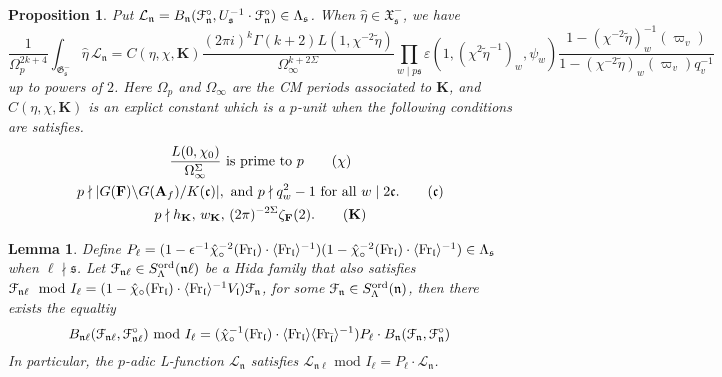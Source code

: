 \documentclass[leqno]{amsart}
\newtheorem{lem}[thm]{Lemma}
\newtheorem{prop}[thm]{Proposition}
\theoremstyle{definition}
\theoremstyle{remark}
\newcommand{\A}{\mathbf A}
\newcommand{\Fr}{\textnormal{Fr}} %
\newcommand{\fc}{\mathfrak{c}}
\newcommand{\fs}{\mathfrak{s}}
\newcommand{\fn}{\mathfrak{n}}
\newcommand{\fl}{\mathfrak{l}}
\newcommand{\F}{{\mathbf{F}}} %
\newcommand{\K}{{\mathbf{K}}} %
\newcommand{\fG}{\mathfrak{G}}
\newcommand{\fX}{\mathfrak{X}}
\newcommand{\euF}{\EuScript{F}} %
\newcommand{\ord}{\textnormal{ord}} %
\begin{document}
\begin{prop}\cite[Thm 7.7]{lee}   
Put $\mathcal{L}_\fn=B_\fn
(\euF^\circ_{\fn},U_\fs^{-1}\cdot\euF^\circ_{\fn})
\in \Lambda_{\fs}$. 
When $ \hat{\eta}\in \fX_{\fs}^-$, we have
\begin{equation*}
	\frac{1}{\Omega_p^{2k+4}}
	\int_{\fG_{\fs}^-}\hat{\eta}\,\mathcal{L}_\fn=
	C(\eta,\chi,\K)
	\frac{(2\pi i)^{k}\Gamma(k+2)
	L(1,\chi^{-2}\tilde{\eta})}{\Omega_\infty^{k+2\Sigma}}
	\prod_{w\mid p\fs}
	\varepsilon(1,(\chi^{2}\tilde{\eta}^{-1})_w,\psi_w)
	\frac{1-(\chi^{-2}\tilde{\eta})^{-1}_w(\varpi_v)}
	{1-(\chi^{-2}\tilde{\eta})_w(\varpi_v)q_v^{-1}}
\end{equation*}
up to powers of $2$.
Here $\Omega_p$ and  $\Omega_\infty$
are the CM periods associated to  $\K$,
and $C(\eta,\chi,\K)$ is an explict constant 
which is a $p$-unit when the following
conditions are satisfies.
\begin{gather}
	\frac{L(0,\chi_0)}{\Omega_\infty^{\Sigma}}
	\text{ is prime to }p
	\label{cond:chi}\tag{$\chi$}\\
	p\nmid |G(\F)\backslash G(\A_f)/K(\fc)|,
	\text{ and }p\nmid q_w^2-1\text{ for all }w\mid 2\fc.
	\label{cond:fc}\tag{$\fc$}\\
	p\nmid h_\K, \, w_\K, \, (2\pi)^{-2\Sigma}\zeta_\F(2).
	\label{cond:K}\tag{$\K$}
\end{gather}
\end{prop}

\begin{lem}\label{lem:compare_L_diff_level}
Define 
$P_\ell=(1-\epsilon^{-1}\hat{\chi}_\circ^{-2}(\Fr_\fl)\cdot 
\langle \Fr_\fl\rangle^{-1})
(1-\hat{\chi}_\circ^{-2}(\Fr_\fl)\cdot 
\langle \Fr_\fl\rangle^{-1})\in \Lambda_{\fs}$
when $\ell\nmid \fs$.
Let $\euF_{\fn\ell}\in S_\Lambda^{\ord}(\fn\ell)$
be a Hida family that also satisfies
$\euF_{\fn\ell} \mod I_{\ell}=
(1-\hat{\chi}_\circ(\Fr_\fl)\cdot 
\langle \Fr_\fl\rangle^{-1} V_\fl)
\euF_{\fn}$,
for some $\euF_{\fn}\in S_\Lambda^{\ord}(\fn)$, then 
there exists the equaltiy
\[
	B_{\fn\ell}(\euF_{\fn\ell}, \euF^{\circ}_{\fn\ell})
	\text{ mod }I_\ell=
	(\hat{\chi}_\circ^{-1}(\Fr_\fl)\cdot 
	\langle \Fr_\fl\rangle
	\langle \Fr_{\bar{\fl}}\rangle^{-1})
	P_\ell\cdot B_{\fn}(\euF_{\fn}, \euF^{\circ}_{\fn})
\]
In particular, 
the $p$-adic L-function $\mathcal{L}_\fn$ satisfies 
$\mathcal{L}_{\fn\ell} \text{ mod }I_\ell=
P_\ell\cdot \mathcal{L}_\fn$.
\end{lem}
\end{document}
